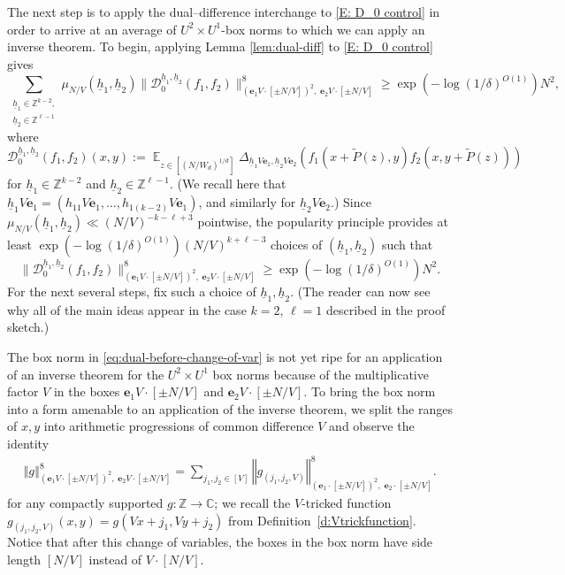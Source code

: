 \documentclass[11pt]{amsart}
\theoremstyle{definition}
\DeclareMathOperator*{\E}{\mathbb{E}}
\newcommand{\C}{{\mathbb C}}
\newcommand{\Z}{{\mathbb Z}}
\newcommand{\be}{{\mathbf{e}}}
\newcommand{\uh}{{\underline{h}}}
\newcommand{\norm}[1]{\left\Vert #1\right\Vert}
\begin{document}
The next step is to apply the dual--difference interchange to \eqref{E: D_0 control} in order to arrive at an average of $U^2\times U^1$-box norms to which we can apply an inverse theorem. To begin, applying Lemma \ref{lem:dual-diff} to \eqref{E: D_0 control} gives
$$\sum_{\substack{\uh_1 \in \mathbb{Z}^{k-2},\\ \uh_2 \in \mathbb{Z}^{\ell-1}}} \mu_{N/V}(\uh_1,\uh_2)\|\mathcal{D}_0^{\uh_1,\uh_2}(f_1,f_2)\|_{(\be_1V\cdot[\pm N/V])^2,\; \be_2V\cdot[\pm N/V]}^8 \geq \exp(-\log(1/\delta)^{O(1)})N^2,$$
where
$$\mathcal{D}_0^{\uh_1,\uh_2}(f_1,f_2)(x,y):=\E_{z \in [(N/W_d)^{1/d}]} \Delta_{\uh_1 V\be_1,\uh_2 V\be_2}(f_1(x+\widetilde P(z),y)f_2(x,y+\widetilde P(z)))$$
for $\uh_1 \in \mathbb{Z}^{k-2}$ and $\uh_2 \in \mathbb{Z}^{\ell-1}$. (We recall here that $\uh_1 V\be_1 = (h_{11}V\be_1, \ldots, h_{1(k-2)}V\be_1)$, and similarly for $\uh_2 V\be_2$.)
Since $\mu_{N/V}(\uh_1,\uh_2) \ll (N/V)^{-k-\ell+3}$ pointwise, the popularity principle provides at least $\exp(-\log(1/\delta)^{O(1)}) (N/V)^{k+\ell-3}$ choices of $(\uh_1,\uh_2)$ such that
\begin{equation} \label{eq:dual-before-change-of-var}
\|\mathcal{D}_0^{\uh_1,\uh_2}(f_1,f_2)\|_{(\be_1V\cdot[\pm N/V])^2,\; \be_2V\cdot[\pm N/V]}^8 \geq \exp(-\log(1/\delta)^{O(1)})N^2.
\end{equation}
For the next several steps, fix such a choice of $\uh_1,\uh_2$.  (The reader can now see why all of the main ideas appear in the case $k=2$, $\ell=1$ described in the proof sketch.)


The box norm in \eqref{eq:dual-before-change-of-var} is not yet ripe for an application of an inverse theorem for the $U^2\times U^1$ box norms because of the multiplicative factor $V$ in the boxes $\be_1V\cdot[\pm N/V]$ and $\be_2V\cdot[\pm N/V]$. To bring the box norm into a form amenable to an application of the inverse theorem, we split the ranges of $x,y$ into arithmetic progressions of common difference $V$ and observe the identity 
\begin{align}\label{E: identity on dilated box norms}
    \norm{g}_{(\be_1V\cdot[\pm N/V])^2,\; \be_2V\cdot[\pm N/V]}^8 = \sum_{j_1, j_2\in[V]} \norm{g_{(j_1, j_2, V)}}_{(\be_1\cdot[\pm N/V])^2,\; \be_2\cdot[\pm N/V]}^8.
\end{align}
for any compactly supported $g:\Z\to\C$; we recall the $V$-tricked function $g_{(j_1, j_2, V)}(x,y)= g(Vx + j_1, Vy + j_2)$ from Definition~\ref{d:Vtrickfunction}. Notice that after this change of variables, the boxes in the box norm have side length $[N/V]$ instead of $V \cdot [N/V]$.
\end{document}
